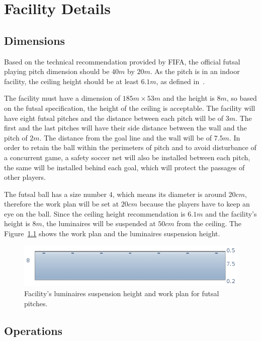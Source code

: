 \chapter{Facility Details}

\section{Dimensions}
Based on the technical recommendation provided by FIFA, the official futsal playing pitch dimension should be $40m$ by $20m$. As the pitch is in an indoor facility, the ceiling height should be at least $6.1m$, as defined in~\cite{www:the_fa_guide}.

The facility must have a dimension of $185m \times 53m$ and the height is $8m$, so based on the futsal specification, the height of the ceiling is acceptable. The facility will have eight futsal pitches and the distance between each pitch will be of $3m$. The first and the last pitches will have their side distance between the wall and the pitch of $2m$. The distance from the goal line and the wall will be of $7.5m$. In order to retain the ball within the perimeters of pitch and to avoid disturbance of a concurrent game, a safety soccer net will also be installed between each pitch, the same will be installed behind each goal, which will protect the passages of other players.

The futsal ball has a size number $4$, which means its diameter is around $20cm$, therefore the work plan will be set at $20cm$ because the players have to keep an eye on the ball. Since the ceiling height recommendation is $6.1m$ and the facility's height is $8m$, the luminaires will be suspended at $50cm$ from the ceiling. The Figure~\ref{fig:cavity_dimensions} shows the work plan and the luminaires suspension height.

\begin{figure}[h!]
\centering
\includegraphics[width=.9\textwidth]{./figs/cavity_dimensions.png}
\caption{Facility's luminaires suspension height and work plan for futsal pitches.}
\label{fig:cavity_dimensions}
\end{figure}

\section{Operations}

